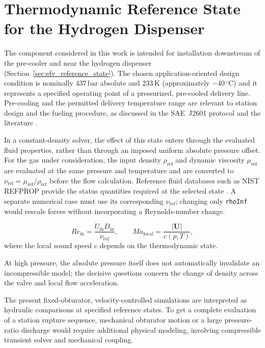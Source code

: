 \section{Thermodynamic Reference State for the Hydrogen Dispenser}
\label{sec:cfd_highpressure_state}

The component considered in this work is intended for installation downstream of the pre-cooler and near the hydrogen dispenser (Section~\ref{sec:efv_reference_state}). The chosen application-oriented design condition is nominally $437\,\mathrm{bar}$ absolute and $233\,\mathrm{K}$ (approximately $-40\,^{\circ}\mathrm{C}$) and it represents a specified operating point of a pressurized, pre-cooled delivery line. Pre-cooling and the permitted delivery temperature range are relevant to station design and the fueling procedure, as discussed in the SAE~J2601 protocol and the literature \cite{sae_j2601,elgowainy2017}.

In a constant-density solver, the effect of this state enters through the evaluated fluid properties, rather than through an imposed uniform absolute pressure offset. For the gas under consideration, the input density $\rho_{\mathrm{ref}}$ and dynamic viscosity $\mu_{\mathrm{ref}}$ are evaluated at the same pressure and temperature and are converted to $\nu_{\mathrm{ref}}=\mu_{\mathrm{ref}}/\rho_{\mathrm{ref}}$ before the flow calculation. Reference fluid databases such as NIST REFPROP provide the status quantities required at the selected state \cite{nist_refprop_online}. A separate numerical case must use its corresponding $\nu_{\mathrm{ref}}$; changing only \texttt{rhoInf} would rescale forces without incorporating a Reynolds-number change.

\begin{equation}
Re_{\mathrm{in}}=\frac{U_{\mathrm{in}}D_{\mathrm{in}}}{\nu_{\mathrm{ref}}},
\qquad
Ma_{\mathrm{local}}=\frac{|\mathbf{U}|}{c(p,T)},
\label{eq:highpressure_re_mach}
\end{equation}
where the local sound speed $c$ depends on the thermodynamic state. 

At high pressure, the absolute pressure itself does not automatically invalidate an incompressible model; the decisive questions concern the change of density across the valve and local flow acceleration.

The present fixed-obturator, velocity-controlled simulations are interpreted as hydraulic comparisons at specified reference states. To get a complete evaluation of a station rupture sequence, mechanical obturator motion or a large pressure-ratio discharge would require additional physical modeling, involving compressible transient solver and mechanical coupling. 

